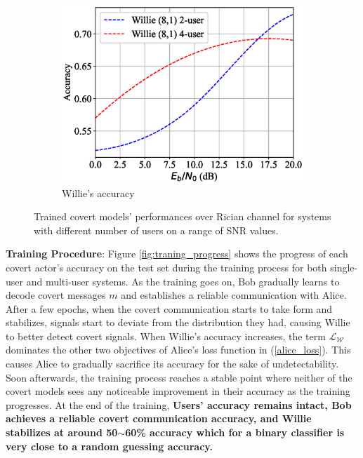\begin{figure}[tp!]
\begin{subfigure}{0.28\textwidth}
		\includegraphics[width=\linewidth]{figs/multi_willie_accuracy_rician}
		\caption{Willie's accuracy}
		\label{fig:multi_rician_results_willie}
	\end{subfigure}
	\caption{Trained covert models' performances over Rician channel for systems with different number of users on a range of SNR values.}
	\label{fig:multi_rician_results}
\end{figure}

\textbf{Training Procedure}: Figure \ref{fig:traning_progress} shows the progress of each covert actor's accuracy on the test set during the training process for both single-user and multi-user systems. As the training goes on, Bob gradually learns to decode covert messages \(m\) and establishes a reliable communication with Alice. After a few epochs, when the covert communication starts to take form and stabilizes, signals start to deviate from the distribution they had, causing Willie to better detect covert signals. When Willie's accuracy increases, the term \(\mathcal{L}_{\mathcal{W}}\) dominates the other two objectives of Alice's loss function in (\ref{alice_loss}). This causes Alice to gradually sacrifice its accuracy for the sake of undetectability. Soon afterwards, the training process reaches a stable point where neither of the covert models sees any noticeable improvement in their accuracy as the training progresses. At the end of the training, \textbf{Users' accuracy remains intact, Bob achieves a reliable covert communication accuracy, and Willie stabilizes at around 50$\sim$60\% accuracy which for a binary classifier is very close to a random guessing accuracy.}

